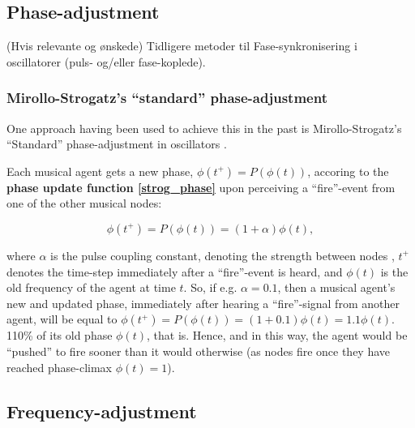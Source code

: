 	\subsection{Phase-adjustment}
	
	
	(Hvis relevante og ønskede) \nl
	Tidligere metoder til Fase-synkronisering i oscillatorer (puls- og/eller fase-koplede).
	
	\subsubsection{Mirollo-Strogatz's ``standard'' phase-adjustment} %
	\label{mirollo_strogatz_phase_adjust}
	
	One approach having been used to achieve this in the past is Mirollo-Strogatz's ``Standard'' phase-adjustment in oscillators \cite{mirollo_strogatz_PCO_synch}.
	
	Each musical agent gets a new phase, $\phi(t^+) = P(\phi(t))$, accoring to the \textbf{phase update function \eqref{strog_phase}} upon perceiving a ``fire''-event from one of the other musical nodes:
	
	\begin{equation}
	\label{strog_phase}
		\phi(t^+) = P(\phi(t)) = (1 + \alpha)\phi(t)	,
	\end{equation}
	
	where $\alpha$ is the pulse coupling constant, denoting the strength between nodes \cite{nymoen_synch}, $t^+$ denotes the time-step immediately after a ``fire''-event is heard, and $\phi(t)$ is the old frequency of the agent at time $t$. So, if e.g. $\alpha = 0.1$, then a musical agent's new and updated phase, immediately after hearing a ``fire''-signal from another agent, will be equal to $\phi(t^+) = P(\phi(t)) = (1 + 0.1)\phi(t) = 1.1\phi(t)$. 110\% of its old phase $\phi(t)$, that is. Hence, and in this way, the agent would be ``pushed'' to fire sooner than it would otherwise (as nodes fire once they have reached phase-climax $\phi(t)=1$).

	
	
	
	\subsection{Frequency-adjustment}
	
	
